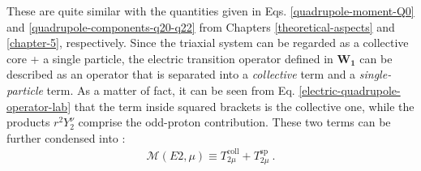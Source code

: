 These are quite similar with the quantities given in Eqs. \ref{quadrupole-moment-Q0} and \ref{quadrupole-components-q20-q22} from Chapters \ref{theoretical-aspects} and \ref{chapter-5}, respectively. Since the triaxial system can be regarded as a collective core + a single particle, the electric transition operator defined in $\mathbf{W_1}$ can be described as an operator that is separated into a \emph{collective} term and a \emph{single-particle} term. As a matter of fact, it can be seen from Eq. \ref{electric-quadrupole-operator-lab} that the term inside squared brackets is the collective one, while the products $r^2Y_2^\nu$ comprise the odd-proton contribution. These two terms can be further condensed into \cite{raduta2020approach}:
\begin{align}
    \mathcal{M}(E2,\mu)\equiv T_{2\mu}^\text{coll}+T_{2\mu}^\text{sp}\ .
    \label{quadrupole-transition-operator-terms}
\end{align}

